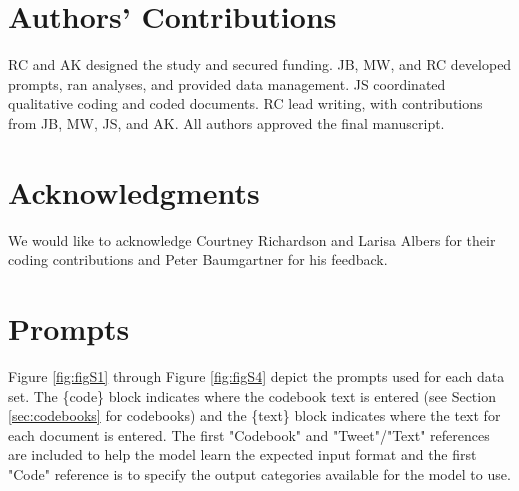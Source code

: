 \documentclass{article}
\begin{document}
\section*{Authors’ Contributions}
RC and AK designed the study and secured funding. JB, MW, and RC developed prompts, ran analyses, and provided data management. JS coordinated qualitative coding and coded documents. RC lead writing, with contributions from JB, MW, JS, and AK.  All authors approved the final manuscript.

\section*{Acknowledgments}
We would like to acknowledge Courtney Richardson and Larisa Albers for their coding contributions and Peter Baumgartner for his feedback.

  
  

\appendix

\pagebreak
\section{Prompts}
\label{sec:prompts}
Figure \ref{fig:figS1} through Figure \ref{fig:figS4} depict the prompts used for each data set. The \{code\} block indicates where the codebook text is entered (see Section \ref{sec:codebooks} for codebooks) and the \{text\} block indicates where the text for each document is entered.  The first "Codebook" and "Tweet"/"Text" references are included to help the model learn the expected input format and the first "Code" reference is to specify the output categories available for the model to use.
\end{document}
